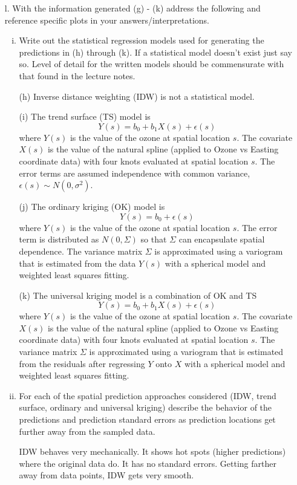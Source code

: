 \documentclass[letterpaper, 12pt]{article}\usepackage[]{graphicx}\usepackage[]{color}
\newenvironment{knitrout}{}{} %
\begin{document}
\begin{enumerate}
\begin{knitrout}
\end{knitrout}


\item[l.]
With the information generated (g) - (k) address the following and reference specific plots in your answers/interpretations.
\begin{enumerate}[(i)]
\item
Write out the statistical regression models used for generating the predictions in (h) through (k). If a statistical model doesn’t exist just say so. Level of detail for the written models should be commensurate with that found in the lecture notes.

{\sf
(h) Inverse distance weighting (IDW) is not a statistical model. 

(i) The trend surface (TS) model is 
\[
Y(s) = b_0 + b_1 X(s) + \epsilon(s)
\]
where $Y(s)$ is the value of the ozone at spatial location $s$. The covariate $X(s)$ is the value of the natural spline (applied to Ozone vs Easting coordinate data) with four knots evaluated at spatial location $s$. The error terms are assumed independence with common variance, $\epsilon(s) \sim N(0, \sigma^2)$.

(j) The ordinary kriging (OK) model is
\[
Y(s) = b_0 + \epsilon(s)
\]
where $Y(s)$ is the value of the ozone at spatial location $s$. The error term is distributed as $N(0, \Sigma)$ so that $\Sigma$ can encapsulate spatial dependence. The variance matrix $\Sigma$ is approximated using a variogram that is estimated from the data $Y(s)$ with a spherical model and weighted least squares fitting.

(k) The universal kriging model is a combination of OK and TS
\[
Y(s) = b_0 + b_1 X(s) + \epsilon(s)
\]
where $Y(s)$ is the value of the ozone at spatial location $s$. The covariate $X(s)$ is the value of the natural spline (applied to Ozone vs Easting coordinate data) with four knots evaluated at spatial location $s$. The variance matrix $\Sigma$ is approximated using a variogram that is estimated from the residuals after regressing $Y$ onto $X$ with a spherical model and weighted least squares fitting.
}
\item
For each of the spatial prediction approaches considered (IDW, trend surface, ordinary and universal kriging) describe the behavior of the predictions and prediction standard errors as prediction locations get further away from the sampled data.

{\sf
IDW behaves very mechanically. It shows hot spots (higher predictions) where the original data do. It has no standard errors. Getting farther away from data points, IDW gets very smooth.

}
\end{enumerate}
\end{enumerate}
\end{document}
